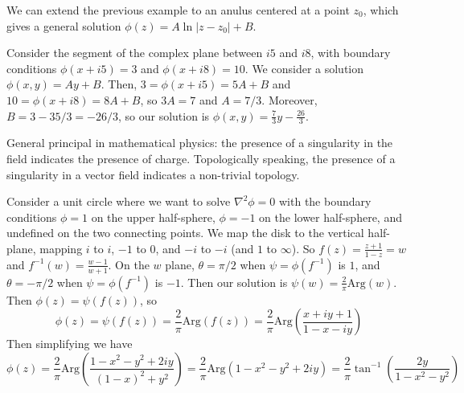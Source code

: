 \begin{example}
    We can extend the previous example to an anulus centered at a point $z_0$, which gives a general solution $\phi(z) = A\ln|z-z_0|+B$.
\end{example}


\begin{example}
    Consider the segment of the complex plane between $i5$ and $i8$, with boundary conditions $\phi(x+i5) = 3$ and $\phi(x+i8) = 10$. We consider a solution $\phi(x,y) = Ay+B$. Then, $3 = \phi(x+i5) = 5A+B$ and $10 = \phi(x+i8) = 8A+B$, so $3A = 7$ and $A = 7/3$. Moreover, $B = 3 - 35/3 = -26/3$, so our solution is $\phi(x,y) = \frac{7}{3}y - \frac{26}{3}$.
\end{example}

General principal in mathematical physics: the presence of a singularity in the field indicates the presence of charge. Topologically speaking, the presence of a singularity in a vector field indicates a non-trivial topology.


\begin{example}
    Consider a unit circle where we want to solve $\nabla^2\phi = 0$ with the boundary conditions $\phi = 1$ on the upper half-sphere, $\phi = -1$ on the lower half-sphere, and undefined on the two connecting points. We map the disk to the vertical half-plane, mapping $i$ to $i$, $-1$ to $0$, and $-i$ to $-i$ (and $1$ to $\infty$). So $f(z) = \frac{z+1}{1-z} = w$ and $f^{-1}(w) = \frac{w-1}{w+1}$. On the $w$ plane, $\theta = \pi/2$ when $\psi = \phi(f^{-1})$ is $1$, and $\theta = -\pi/2$ when $\psi = \phi(f^{-1})$ is $-1$. Then our solution is $\psi(w) = \frac{2}{\pi}\text{Arg}(w)$. Then $\phi(z) = \psi(f(z))$, so \begin{equation*}
        \phi(z) = \psi(f(z)) = \frac{2}{\pi}\text{Arg}(f(z)) = \frac{2}{\pi}\text{Arg}\left(\frac{x+iy+1}{1-x-iy}\right)
    \end{equation*}
    Then simplifying we have \begin{equation*}
        \phi(z) = \frac{2}{\pi} \text{Arg}\left(\frac{1-x^2-y^2+2iy}{(1-x)^2+y^2}\right) = \frac{2}{\pi}\text{Arg}(1-x^2-y^2+2iy) = \frac{2}{\pi}\tan^{-1}\left(\frac{2y}{1-x^2-y^2}\right)
    \end{equation*}
\end{example}

